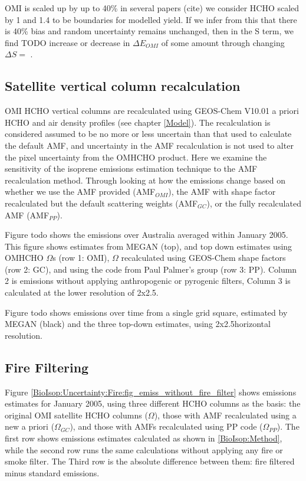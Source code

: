     OMI is scaled up by up to 40\% in several papers (cite) we consider HCHO scaled by 1 and 1.4 to be boundaries for modelled yield.
    If we infer from this that there is 40\% bias and random uncertainty remains unchanged, then in the S term, we find TODO increase or decrease in $\Delta{E_{OMI}}$ of some amount through changing $\Delta{S}=$ .
    
    
  \subsection{Satellite vertical column recalculation}
    
    OMI HCHO vertical columns are recalculated using GEOS-Chem V10.01 a priori HCHO and air density profiles (see chapter \ref{Model}).
    The recalculation is considered assumed to be no more or less uncertain than that used to calculate the default AMF, and uncertainty in the AMF recalculation is not used to alter the pixel uncertainty from the OMHCHO product.
    Here we examine the sensitivity of the isoprene emissions estimation technique to the AMF recalculation method.
    Through looking at how the emissions change based on whether we use the AMF provided (AMF$_{OMI}$), the AMF with shape factor recalculated but the default scattering weights (AMF$_{GC}$), or the fully recalculated AMF (AMF$_{PP}$).
    
    Figure todo shows the emissions over Australia averaged within January 2005.
    This figure shows estimates from MEGAN (top), and top down estimates using OMHCHO $\Omega$s (row 1: OMI), $\Omega$ recalculated using GEOS-Chem shape factors (row 2: GC), and using the code from Paul Palmer's group (row 3: PP).
    Column 2 is emissions without applying anthropogenic or pyrogenic filters, Column 3 is calculated at the lower resolution of 2x2.5\degr.
    
    Figure todo shows emissions over time from a single grid square, estimated by MEGAN (black) and the three top-down estimates, using 2x2.5\degr horizontal resolution.
  
  \subsection{Fire Filtering}
    
    Figure \ref{BioIsop:Uncertainty:Fire:fig_emiss_without_fire_filter} shows emissions estimates for January 2005, using three different HCHO columns as the basis: the original OMI satellite HCHO columns ($\Omega$), those with AMF recalculated using a new a priori ($\Omega_{GC}$), and those with AMFs recalculated using PP code ($\Omega_{PP}$).
    The first row shows emissions estimates calculated as shown in \ref{BioIsop:Method}, while the second row runs the same calculations without applying any fire or smoke filter.
    The Third row is the absolute difference between them: fire filtered minus standard emissions.
    
